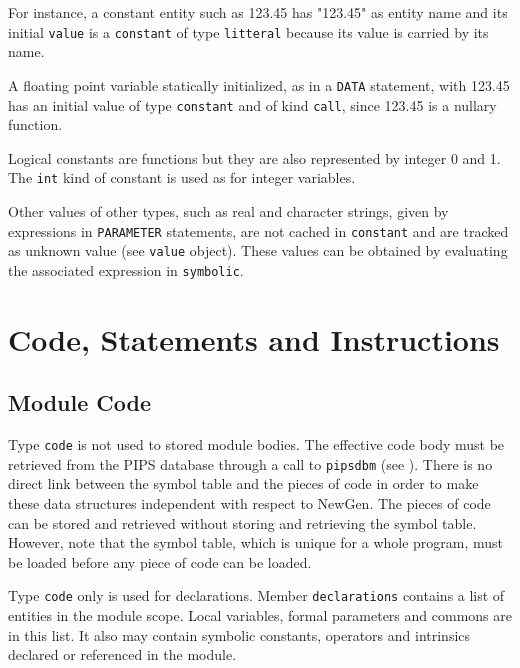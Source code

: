 \documentclass[a4paper]{article}
\begin{document}
For instance, a constant entity such as 123.45 has "123.45" as entity name
and its initial \verb/value/ is a \verb/constant/ of type \verb/litteral/
because its value is carried by its name. 

A floating point variable statically initialized, as in a \verb/DATA/
statement, with 123.45 has an initial value of type \verb/constant/ and of
kind \verb/call/, since 123.45 is a nullary function.

Logical constants are functions but they are also represented by integer 0
and 1. The \verb/int/ kind of constant is used as for integer variables.

Other values of other types, such as real and character strings, given by
expressions in \verb/PARAMETER/ statements, are not cached in
\verb/constant/ and are tracked as unknown value (see \verb/value/
object). These values can be obtained by evaluating the associated
expression in \verb/symbolic/.

\section{Code, Statements and Instructions}
\label{code}

\subsection{Module Code}
\label{subsection-code}

{}

Type \texttt{code} is not used to stored module bodies. The effective
code body must be retrieved from the PIPS database through a call to
\texttt{pipsdbm} (see \cite{Trio90}). There is no direct link between
the symbol table and the pieces of code in order to make these data
structures independent with respect to NewGen. The pieces of code can
be stored and retrieved without storing and retrieving the symbol
table. However, note that the symbol table, which is unique for a
whole program, must be loaded before any piece of code can be loaded.

Type \texttt{code} only is used for declarations. Member \texttt{declarations}
contains a list of entities in the module scope. Local variables, formal
parameters and commons are in this list. It also may contain symbolic
constants, operators and intrinsics declared or referenced in the module.
\end{document}
